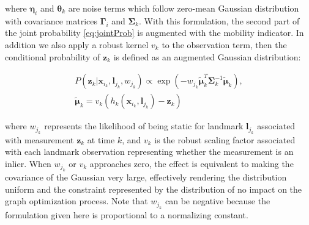 where $\boldsymbol{\eta}_i$ and $\boldsymbol{\theta}_k$ are noise terms which follow zero-mean Gaussian distribution with covariance matrices $\boldsymbol{\Gamma}_i$ and $\boldsymbol{\Sigma}_k$. With this formulation, the second part of the joint probability \ref{eq:jointProb} is augmented with the mobility indicator. In addition we also apply a robust kernel $v_k$ to the observation term, then the conditional probability of $\boldsymbol{z}_k$ is defined as an augmented Gaussian distribution:

\begin{equation}
\begin{aligned}
P(\boldsymbol{z}_k|\boldsymbol{x}_{i_k}, \boldsymbol{l}_{j_k}, w_{j_k})\propto \exp(-w_{j_k} \tilde{\boldsymbol{\mu}}_k^T \boldsymbol{\Sigma}_k^{-1} \tilde{\boldsymbol{\mu}}_k),\\
 \tilde{\boldsymbol{\mu}}_k = v_k(h_k(\boldsymbol{x}_{i_k}, \boldsymbol{l}_{j_k}) - \boldsymbol{z}_k)
\label{eq:sensor}
\end{aligned}
\end{equation}

where $w_{j_k}$ represents the likelihood of being static for landmark $\boldsymbol{l}_{j_k}$ associated with measurement $\boldsymbol{z}_k$ at time $k$, and $v_k$ is the robust scaling factor associated with each landmark observation representing whether the measurement is an inlier. When $w_{j_k}$ or $v_k$ approaches zero, the effect is equivalent to making the covariance of the Gaussian very large, effectively rendering the distribution uniform and the constraint represented by the distribution of no impact on the graph optimization process. Note that $w_{j_k}$ can be negative because the formulation given here is proportional to a normalizing constant.
